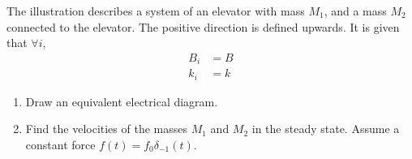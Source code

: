 \documentclass[fleqn, a4paper, 11pt, oneside]{amsart}
\theoremstyle{definition}
\theoremstyle{theorem}
\begin{document}
\begin{question}
\begin{figure}[H]
	\end{figure}
	The illustration describes a system of an elevator with mass $M_1$, and a mass $M_2$ connected to the elevator.
	The positive direction is defined upwards.
	It is given that $\forall i$,
	\begin{align*}
		B_i & = B \\
		k_i & = k
	\end{align*}
	\begin{enumerate}
		\item
			Draw an equivalent electrical diagram.
		\item
			Find the velocities of the masses $M_1$ and $M_2$ in the steady state.
			Assume a constant force $f(t) = f_0 \delta_{-1}(t)$.
	\end{enumerate}
\end{question}
\end{document}
